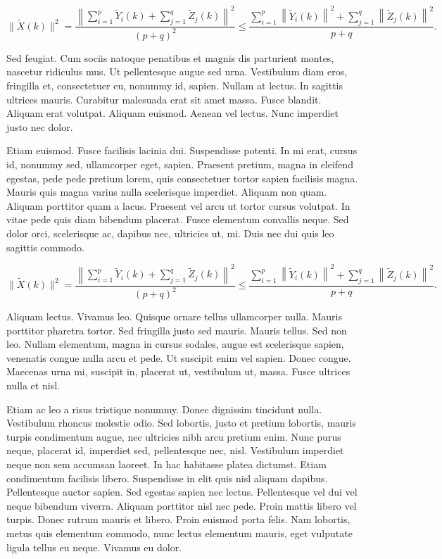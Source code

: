 \documentclass[APA,LATO1COL]{WileyNJD-v2}
\begin{document}
\begin{equation}\label{eq23}
 \|\tilde{X}(k)\|^2
 =\frac{\left\|\sum\limits_{i=1}^{p}\tilde{Y}_i(k)+\sum\limits_{j=1}^{q}\tilde{Z}_j(k) \right\|^2}{(p+q)^2}
 \leq\frac{\sum\limits_{i=1}^{p}\left\|\tilde{Y}_i(k)\right\|^2+\sum\limits_{j=1}^{q}\left\|\tilde{Z}_j(k)\right\|^2 }{p+q}.
\end{equation}

Sed feugiat. Cum sociis natoque penatibus et magnis dis parturient montes, nascetur ridiculus mus. Ut pellentesque
augue sed urna. Vestibulum diam eros, fringilla et, consectetuer eu, nonummy id, sapien. Nullam at lectus. In sagittis
ultrices mauris. Curabitur malesuada erat sit amet massa. Fusce blandit. Aliquam erat volutpat. Aliquam euismod.
Aenean vel lectus. Nunc imperdiet justo nec dolor.

Etiam euismod. Fusce facilisis lacinia dui. Suspendisse potenti. In mi erat, cursus id, nonummy sed, ullamcorper
eget, sapien. Praesent pretium, magna in eleifend egestas, pede pede pretium lorem, quis consectetuer tortor sapien
facilisis magna. Mauris quis magna varius nulla scelerisque imperdiet. Aliquam non quam. Aliquam porttitor quam
a lacus. Praesent vel arcu ut tortor cursus volutpat. In vitae pede quis diam bibendum placerat. Fusce elementum
convallis neque. Sed dolor orci, scelerisque ac, dapibus nec, ultricies ut, mi. Duis nec dui quis leo sagittis commodo.

\begin{equation}\label{eq24}
 \|\tilde{X}(k)\|^2
 =\frac{\left\|\sum\limits_{i=1}^{p}\tilde{Y}_i(k)+\sum\limits_{j=1}^{q}\tilde{Z}_j(k) \right\|^2}{(p+q)^2}
 \leq\frac{\sum\limits_{i=1}^{p}\left\|\tilde{Y}_i(k)\right\|^2+\sum\limits_{j=1}^{q}\left\|\tilde{Z}_j(k)\right\|^2 }{p+q}.
\end{equation}

Aliquam lectus. Vivamus leo. Quisque ornare tellus ullamcorper nulla. Mauris porttitor pharetra
tortor. Sed fringilla justo sed mauris. Mauris tellus. Sed non leo. Nullam elementum, magna in cursus sodales, augue
est scelerisque sapien, venenatis congue nulla arcu et pede. Ut suscipit enim vel sapien. Donec congue. Maecenas
urna mi, suscipit in, placerat ut, vestibulum ut, massa. Fusce ultrices nulla et nisl.

Etiam ac leo a risus tristique nonummy. Donec dignissim tincidunt nulla. Vestibulum rhoncus molestie odio. Sed
lobortis, justo et pretium lobortis, mauris turpis condimentum augue, nec ultricies nibh arcu pretium enim. Nunc
purus neque, placerat id, imperdiet sed, pellentesque nec, nisl. Vestibulum imperdiet neque non sem accumsan laoreet.
In hac habitasse platea dictumst. Etiam condimentum facilisis libero. Suspendisse in elit quis nisl aliquam dapibus.
Pellentesque auctor sapien. Sed egestas sapien nec lectus. Pellentesque vel dui vel neque bibendum viverra. Aliquam
porttitor nisl nec pede. Proin mattis libero vel turpis. Donec rutrum mauris et libero. Proin euismod porta felis.
Nam lobortis, metus quis elementum commodo, nunc lectus elementum mauris, eget vulputate ligula tellus eu neque.
Vivamus eu dolor.
\end{document}
